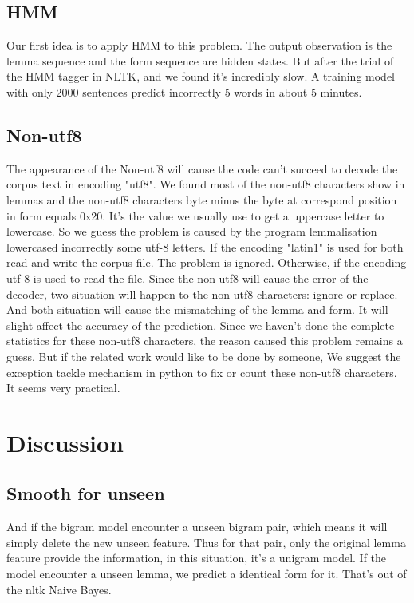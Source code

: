 \documentclass[a4paper]{article}
\begin{document}
\subsection*{HMM}
Our first idea is to apply HMM to this problem. The output observation is the lemma sequence and the form sequence are hidden states. But after the trial of the HMM tagger in NLTK, and we found it's incredibly slow. A training model with only 2000 sentences predict incorrectly 5 words in about 5 minutes. 

\subsection*{Non-utf8}
The appearance  of the Non-utf8 will cause the code can't succeed to decode the corpus text in encoding "utf8". We found most of the non-utf8 characters show in lemmas and the non-utf8 characters byte minus the byte at correspond position in form equals 0x20. It's the value we usually use to get a uppercase letter to lowercase. So we guess the problem is caused by the program lemmalisation lowercased incorrectly some utf-8 letters. If the encoding "latin1" is used for both read and write the corpus file. The problem is ignored. Otherwise, if the encoding utf-8 is used to read the file. Since the non-utf8 will cause the error of the decoder, two situation will happen to the non-utf8 characters: ignore or replace. And both situation will cause the mismatching of the lemma and form. It will slight affect the accuracy of the prediction. 
Since we haven't done the complete statistics for these non-utf8 characters, the reason caused this problem remains a guess. But if the related work would like to be done by someone, We suggest the exception tackle mechanism in python to fix or count these non-utf8 characters. It seems very practical.  

\section{Discussion}
\subsection*{Smooth for unseen}
And if the bigram model encounter a unseen bigram pair, which means it will simply delete the new unseen feature.\cite{loper_nltk.classify.naivebayes_nodate} Thus for that pair, only the original lemma feature provide the information, in this situation, it's a unigram model.
If the model encounter a unseen lemma, we predict a identical form for it. That's out of the nltk Naive Bayes. 
\end{document}

